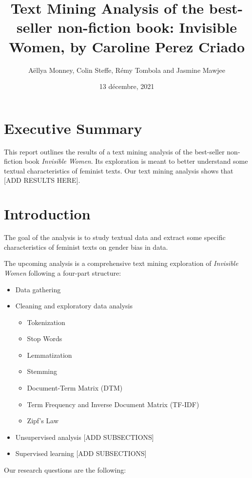 \documentclass[
]{article}
\title{Text Mining Analysis of the best-seller non-fiction book:
Invisible Women, by Caroline Perez Criado}
\author{Aëllya Monney, Colin Steffe, Rémy Tombola and Jasmine Mawjee}
\date{13 décembre, 2021}
\providecommand{\tightlist}{%
  \setlength{\itemsep}{0pt}\setlength{\parskip}{0pt}}
\begin{document}
\maketitle

\hypertarget{executive-summary}{%
\section{Executive Summary}\label{executive-summary}}

This report outlines the results of a text mining analysis of the
best-seller non-fiction book \emph{Invisible Women}. Its exploration is
meant to better understand some textual characteristics of feminist
texts. Our text mining analysis shows that {[}ADD RESULTS HERE{]}.

\hypertarget{introduction}{%
\section{Introduction}\label{introduction}}

The goal of the analysis is to study textual data and extract some
specific characteristics of feminist texts on gender bias in data.

The upcoming analysis is a comprehensive text mining exploration of
\emph{Invisible Women} following a four-part structure:

\begin{itemize}
\tightlist
\item
  Data gathering
\item
  Cleaning and exploratory data analysis

  \begin{itemize}
  \tightlist
  \item
    Tokenization
  \item
    Stop Words
  \item
    Lemmatization
  \item
    Stemming
  \item
    Document-Term Matrix (DTM)
  \item
    Term Frequency and Inverse Document Matrix (TF-IDF)
  \item
    Zipf's Law
  \end{itemize}
\item
  Unsupervised analysis {[}ADD SUBSECTIONS{]}
\item
  Supervised learning {[}ADD SUBSECTIONS{]}
\end{itemize}

Our research questions are the following:
\end{document}
